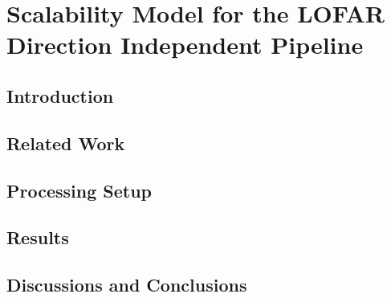 \chapter{Scalability Model for the LOFAR Direction Independent Pipeline}\label{ch:Scalability_model}
\begin{abstract}


\end{abstract}

\section{\label{sec:ch6_intro}Introduction }


\section{Related Work}\label{sec:ch6_related}


\section{Processing Setup }\label{sec:ch6_methods}



\section{Results}\label{sec:ch6_results}


\section{Discussions and Conclusions}\label{sec:ch6_discussions}



